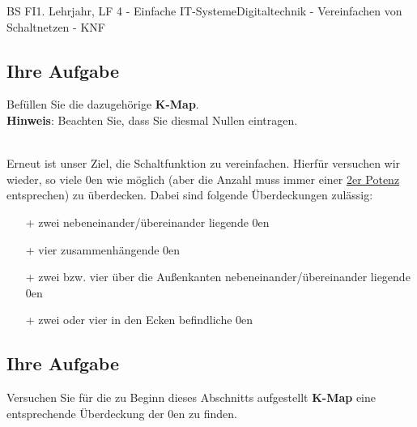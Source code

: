 \documentclass[11pt,twocolumn,oneside,openany,headings=optiontotoc,11pt,numbers=noenddot]{article}
\begin{document}
\begin{worksheet}{BS FI}{1. Lehrjahr, LF 4 - Einfache IT-Systeme}{Digitaltechnik - Vereinfachen von Schaltnetzen - KNF}
		\subsection*{Ihre Aufgabe} Befüllen Sie die dazugehörige \textbf{K-Map}.\\
		\small{\textbf{Hinweis}: Beachten Sie, dass Sie diesmal Nullen eintragen.}\normalsize\\
		\begin{karnaugh-map}[4][4][1][$x_3x_4$][$x_1x_2$]
			
		\end{karnaugh-map}\\
		Erneut ist unser Ziel, die Schaltfunktion zu vereinfachen. Hierfür versuchen wir wieder, so viele \(0\)en wie möglich (aber die Anzahl muss immer einer \underline{2er Potenz} entsprechen) zu überdecken. Dabei sind folgende Überdeckungen zulässig:
		\begin{itemize}
			\item[+] zwei nebeneinander/übereinander liegende \(0\)en
			\item[+] vier zusammenhängende \(0\)en
			\item[+] zwei bzw. vier über die Außenkanten nebeneinander/übereinander liegende \(0\)en
			\item[+] zwei oder vier in den Ecken befindliche \(0\)en
		\end{itemize}
		\begin{karnaugh-map}[4][4][1][$x_3x_4$][$x_1x_2$]
		\end{karnaugh-map}
		\begin{karnaugh-map}[4][4][1][$x_3x_4$][$x_1x_2$]
		\end{karnaugh-map}
		\begin{karnaugh-map}[4][4][1][$x_3x_4$][$x_1x_2$]
		\end{karnaugh-map}
		\begin{karnaugh-map}[4][4][1][$x_3x_4$][$x_1x_2$]
			\implicantcorner
		\end{karnaugh-map}
		\subsection*{Ihre Aufgabe} Versuchen Sie für die zu Beginn dieses Abschnitts aufgestellt \textbf{K-Map} eine entsprechende Überdeckung der \(0\)en zu finden.
		\newpage

\end{worksheet}
\end{document}
